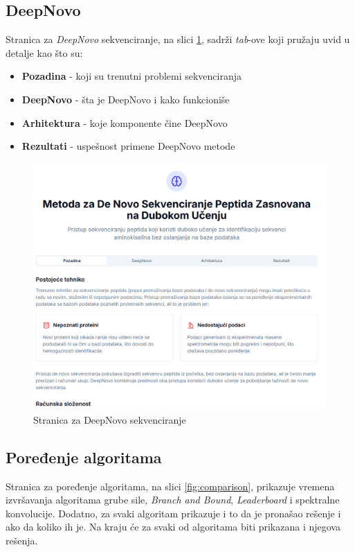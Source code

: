 \documentclass[12pt,oneside]{memoir}
\begin{document}
\subsection{DeepNovo}
Stranica za \emph{DeepNovo} sekvenciranje, na slici \ref{fig:deepnovo_1}, sadrži \emph{tab}-ove koji pružaju uvid u detalje kao što su:
\begin{itemize}
    \item \textbf{Pozadina} - koji su trenutni problemi sekvenciranja
    \item \textbf{DeepNovo} - šta je DeepNovo i kako funkcioniše
    \item \textbf{Arhitektura} - koje komponente čine DeepNovo
    \item \textbf{Rezultati} - uspešnost primene DeepNovo metode
\end{itemize}

\begin{figure}[H]
\centering
\includegraphics[width=1\textwidth]{images/deepnovo_1.png}
\caption{Stranica za DeepNovo sekvenciranje}
\label{fig:deepnovo_1}
\end{figure}

\subsection{Poređenje algoritama}

Stranica za poređenje algoritama, na slici \ref{fig:comparison}, prikazuje vremena izvršavanja algoritama grube sile, \emph{Branch and Bound}, \emph{Leaderboard} i spektralne konvolucije. Dodatno, za svaki algoritam prikazuje i to da je pronašao rešenje i ako da koliko ih je. Na kraju će za svaki od algoritama biti prikazana i njegova rešenja. 
\end{document}
